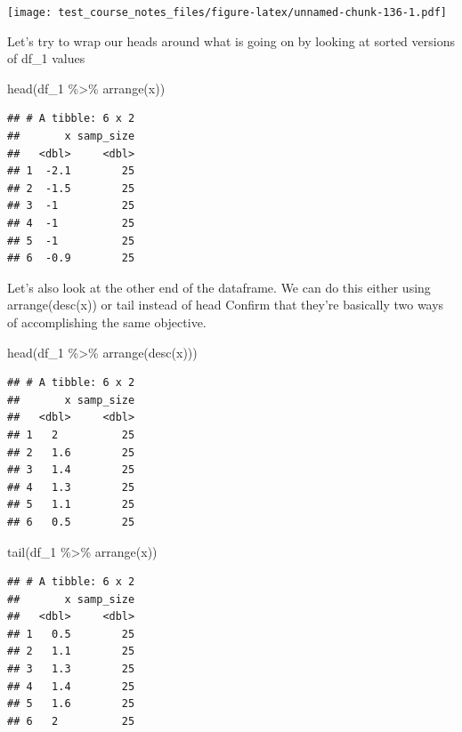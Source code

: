 \documentclass[
]{book}
\newenvironment{Shaded}{\begin{snugshade}}{\end{snugshade}}
\newcommand{\FunctionTok}[1]{\textcolor[rgb]{0.00,0.00,0.00}{#1}}
\newcommand{\NormalTok}[1]{#1}
\newcommand{\SpecialCharTok}[1]{\textcolor[rgb]{0.00,0.00,0.00}{#1}}
\begin{document}
\texttt{[image: test\_course\_notes\_files/figure-latex/unnamed-chunk-136-1.pdf]}

Let's try to wrap our heads around what is going on by looking at sorted versions of df\_1 values

\begin{Shaded}
\begin{Highlighting}[]
\FunctionTok{head}\NormalTok{(df\_1 }\SpecialCharTok{\%\textgreater{}\%} \FunctionTok{arrange}\NormalTok{(x))}
\end{Highlighting}
\end{Shaded}

\begin{verbatim}
## # A tibble: 6 x 2
##       x samp_size
##   <dbl>     <dbl>
## 1  -2.1        25
## 2  -1.5        25
## 3  -1          25
## 4  -1          25
## 5  -1          25
## 6  -0.9        25
\end{verbatim}

Let's also look at the other end of the dataframe. We can do this either using arrange(desc(x)) or tail instead of head
Confirm that they're basically two ways of accomplishing the same objective.

\begin{Shaded}
\begin{Highlighting}[]
\FunctionTok{head}\NormalTok{(df\_1 }\SpecialCharTok{\%\textgreater{}\%} \FunctionTok{arrange}\NormalTok{(}\FunctionTok{desc}\NormalTok{(x)))}
\end{Highlighting}
\end{Shaded}

\begin{verbatim}
## # A tibble: 6 x 2
##       x samp_size
##   <dbl>     <dbl>
## 1   2          25
## 2   1.6        25
## 3   1.4        25
## 4   1.3        25
## 5   1.1        25
## 6   0.5        25
\end{verbatim}

\begin{Shaded}
\begin{Highlighting}[]
\FunctionTok{tail}\NormalTok{(df\_1 }\SpecialCharTok{\%\textgreater{}\%} \FunctionTok{arrange}\NormalTok{(x))}
\end{Highlighting}
\end{Shaded}

\begin{verbatim}
## # A tibble: 6 x 2
##       x samp_size
##   <dbl>     <dbl>
## 1   0.5        25
## 2   1.1        25
## 3   1.3        25
## 4   1.4        25
## 5   1.6        25
## 6   2          25
\end{verbatim}
\end{document}
